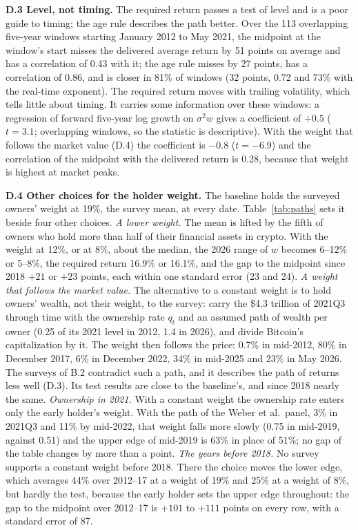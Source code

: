 \documentclass[11pt]{article}
\begin{document}
\textbf{D.3 Level, not timing.} The required return passes a test of level and is a poor guide to timing; the age rule describes the path better. Over the 113 overlapping five-year windows starting January 2012 to May 2021, the midpoint at the window's start misses the delivered average return by 51 points on average and has a correlation of 0.43 with it; the age rule misses by 27 points, has a correlation of 0.86, and is closer in 81\% of windows (32 points, 0.72 and 73\% with the real-time exponent). The required return moves with trailing volatility, which tells little about timing. It carries some information over these windows: a regression of forward five-year log growth on $\sigma^2 w$ gives a coefficient of $+0.5$ ($t = 3.1$; overlapping windows, so the statistic is descriptive). With the weight that follows the market value (D.4) the coefficient is $-0.8$ ($t = -6.9$) and the correlation of the midpoint with the delivered return is 0.28, because that weight is highest at market peaks.

\textbf{D.4 Other choices for the holder weight.} The baseline holds the surveyed owners' weight at 19\%, the survey mean, at every date. Table~\ref{tab:paths} sets it beside four other choices. \emph{A lower weight.} The mean is lifted by the fifth of owners who hold more than half of their financial assets in crypto. With the weight at 12\%, or at 8\%, about the median, the 2026 range of $w$ becomes 6--12\% or 5--8\%, the required return 16.9\% or 16.1\%, and the gap to the midpoint since 2018 $+21$ or $+23$ points, each within one standard error (23 and 24). \emph{A weight that follows the market value.} The alternative to a constant weight is to hold owners' wealth, not their weight, to the survey: carry the \$4.3 trillion of 2021Q3 through time with the ownership rate $q_t$ and an assumed path of wealth per owner (0.25 of its 2021 level in 2012, 1.4 in 2026), and divide Bitcoin's capitalization by it. The weight then follows the price: 0.7\% in mid-2012, 80\% in December 2017, 6\% in December 2022, 34\% in mid-2025 and 23\% in May 2026. The surveys of B.2 contradict such a path, and it describes the path of returns less well (D.3). Its test results are close to the baseline's, and since 2018 nearly the same. \emph{Ownership in 2021.} With a constant weight the ownership rate enters only the early holder's weight. With the path of the Weber et al.\ panel, 3\% in 2021Q3 and 11\% by mid-2022, that weight falls more slowly (0.75 in mid-2019, against 0.51) and the upper edge of mid-2019 is 63\% in place of 51\%; no gap of the table changes by more than a point. \emph{The years before 2018.} No survey supports a constant weight before 2018. There the choice moves the lower edge, which averages 44\% over 2012--17 at a weight of 19\% and 25\% at a weight of 8\%, but hardly the test, because the early holder sets the upper edge throughout: the gap to the midpoint over 2012--17 is $+101$ to $+111$ points on every row, with a standard error of 87.
\end{document}
